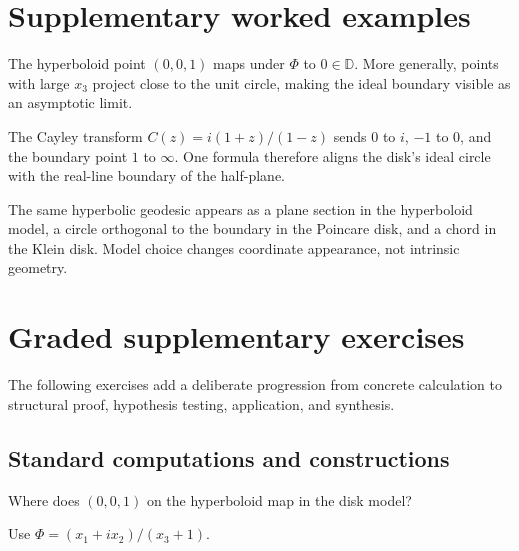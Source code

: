 \section{Supplementary worked examples}
\label{sec:vii31-pedagogy}

\begin{example}\label{ex:vii31-ped-01}
The hyperboloid point \((0,0,1)\) maps under \(\Phi\) to \(0\in\mathbb D\).  More generally, points with large \(x_3\) project close to the unit circle, making the ideal boundary visible as an asymptotic limit.
\end{example}

\begin{example}\label{ex:vii31-ped-02}
The Cayley transform \(C(z)=i(1+z)/(1-z)\) sends \(0\) to \(i\), \(-1\) to \(0\), and the boundary point \(1\) to \(\infty\).  One formula therefore aligns the disk's ideal circle with the real-line boundary of the half-plane.
\end{example}

\begin{example}\label{ex:vii31-ped-03}
The same hyperbolic geodesic appears as a plane section in the hyperboloid model, a circle orthogonal to the boundary in the Poincare disk, and a chord in the Klein disk.  Model choice changes coordinate appearance, not intrinsic geometry.
\end{example}

\section{Graded supplementary exercises}
The following exercises add a deliberate progression from concrete calculation to structural proof, hypothesis testing, application, and synthesis.

\subsection*{Standard computations and constructions}

\begin{exercise}\label{exr:vii31-ped-01}
Where does \((0,0,1)\) on the hyperboloid map in the disk model?
\end{exercise}

\begin{hint}
Use \(\Phi=(x_1+ix_2)/(x_3+1)\).
\end{hint}

